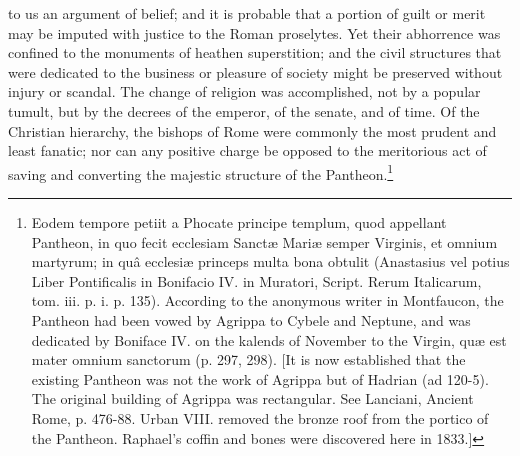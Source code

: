 to us an argument of belief; and it is probable that a portion of guilt or merit may be imputed with justice to the Roman proselytes. Yet their abhorrence was confined to the monuments of heathen superstition; and the civil structures that were dedicated to the business or pleasure of society might be preserved without injury or scandal. The change of religion was accomplished, not by a popular tumult, but by the decrees of the emperor, of the senate, and of time. Of the Christian hierarchy, the bishops of Rome were commonly the most prudent and least fanatic; nor can any positive charge be opposed to the meritorious act of saving and converting the majestic structure of the Pantheon.\footnote{Eodem tempore petiit a Phocate principe templum, quod appellant Pantheon, in quo fecit ecclesiam Sanctæ Mariæ semper Virginis, et omnium martyrum; in quâ ecclesiæ princeps multa bona obtulit (Anastasius vel potius Liber Pontificalis in Bonifacio IV. in Muratori, Script. Rerum Italicarum, tom. iii. p. i. p. 135). According to the anonymous writer in Montfaucon, the Pantheon had been vowed by Agrippa to Cybele and Neptune, and was dedicated by Boniface IV. on the kalends of November to the Virgin, quæ est mater omnium sanctorum (p. 297, 298). [It is now established that the existing Pantheon was not the work of Agrippa but of Hadrian (ad 120-5). The original building of Agrippa was rectangular. See Lanciani, Ancient Rome, p. 476-88. Urban VIII. removed the bronze roof from the portico of the Pantheon. Raphael\texthebrew{}’s coffin and bones were discovered here in 1833.]}

